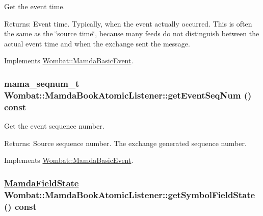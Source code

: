 Get the event time. 

\begin{Desc}
\item[Returns:]Event time. Typically, when the event actually occurred. This is often the same as the \char`\"{}source time\char`\"{}, because many feeds do not distinguish between the actual event time and when the exchange sent the message. \end{Desc}


Implements \hyperlink{classWombat_1_1MamdaBasicEvent_7285491c2c657207a64b1b0449c0339b}{Wombat::Mamda\-Basic\-Event}.\hypertarget{classWombat_1_1MamdaBookAtomicListener_8110769b71d79b631531693c52449b72}{
\subsubsection[getEventSeqNum]{\setlength{\rightskip}{0pt plus 5cm}mama\_\-seqnum\_\-t Wombat::Mamda\-Book\-Atomic\-Listener::get\-Event\-Seq\-Num () const}}
\label{classWombat_1_1MamdaBookAtomicListener_8110769b71d79b631531693c52449b72}


Get the event sequence number. 

\begin{Desc}
\item[Returns:]Source sequence number. The exchange generated sequence number. \end{Desc}


Implements \hyperlink{classWombat_1_1MamdaBasicEvent_1fd845d48e95b4ee3beafc72d1ac2adf}{Wombat::Mamda\-Basic\-Event}.\hypertarget{classWombat_1_1MamdaBookAtomicListener_6d0fa4b94f34bf538d1324ee65a08cdf}{
\subsubsection[getSymbolFieldState]{\setlength{\rightskip}{0pt plus 5cm}\hyperlink{namespaceWombat_93aac974f2ab713554fd12a1fa3b7d2a}{Mamda\-Field\-State} Wombat::Mamda\-Book\-Atomic\-Listener::get\-Symbol\-Field\-State () const}}
\label{classWombat_1_1MamdaBookAtomicListener_6d0fa4b94f34bf538d1324ee65a08cdf}


